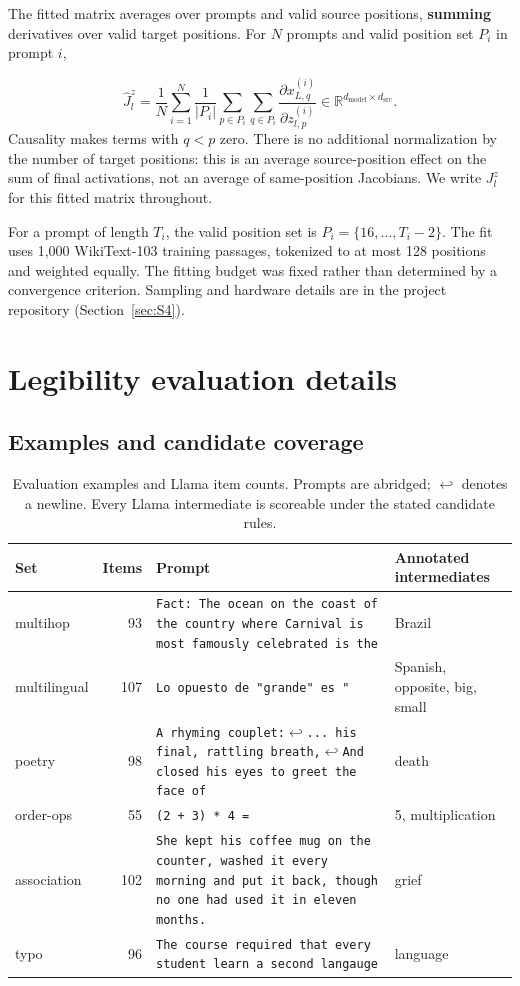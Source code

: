 \documentclass[11pt,a4paper]{article}
\newcommand{\code}[1]{\texttt{#1}}       %
\begin{document}
The fitted matrix averages over prompts and valid source positions, \textbf{summing} derivatives over valid target positions. For $N$ prompts and valid position set $P_i$ in prompt $i$,

\[
\widehat J_l^z=
\frac1N\sum_{i=1}^{N}\frac1{|P_i|}
\sum_{p\in P_i}\sum_{q\in P_i}
\frac{\partial x^{(i)}_{L,q}}{\partial z^{(i)}_{l,p}}
\in\mathbb R^{d_{\mathrm{model}}\times d_{\mathrm{src}}}.
\]
Causality makes terms with $q<p$ zero. There is no additional normalization by the number of target positions: this is an average source-position effect on the sum of final activations, not an average of same-position Jacobians. We write $J_l^z$ for this fitted matrix throughout.

For a prompt of length $T_i$, the valid position set is $P_i=\{16,\ldots,T_i-2\}$. The fit uses 1,000 WikiText-103 training passages, tokenized to at most 128 positions and weighted equally. The fitting budget was fixed rather than determined by a convergence criterion. Sampling and hardware details are in the project repository (Section~\ref{sec:S4}).

\section{Legibility evaluation details}\label{sec:S2}

\subsection{Examples and candidate coverage}\label{sec:S2.1}

\begin{table}[htbp]
\centering
\small
\setlength{\tabcolsep}{4pt}
\caption{Evaluation examples and Llama item counts. Prompts are abridged; $\hookleftarrow$ denotes a newline. Every Llama intermediate is scoreable under the stated candidate rules.}
\label{tab:S1}
\begin{tabularx}{\linewidth}{@{}lr>{\raggedright\arraybackslash}Xl@{}}
\toprule
Set & Items & Prompt & Annotated intermediates \\
\midrule
multihop & 93 & \code{Fact: The ocean on the coast of the country where Carnival is most famously celebrated is the} & Brazil \\
multilingual & 107 & \code{Lo opuesto de "grande" es "} & Spanish, opposite, big, small \\
poetry & 98 & \code{A rhyming couplet:}$\hookleftarrow$\code{... his final, rattling breath,}$\hookleftarrow$\code{And closed his eyes to greet the face of} & death \\
order-ops & 55 & \code{(2 + 3) * 4 =} & 5, multiplication \\
association & 102 & \code{She kept his coffee mug on the counter, washed it every morning and put it back, though no one had used it in eleven months.} & grief \\
typo & 96 & \code{The course required that every student learn a second langauge} & language \\
\bottomrule
\end{tabularx}
\end{table}
\end{document}
